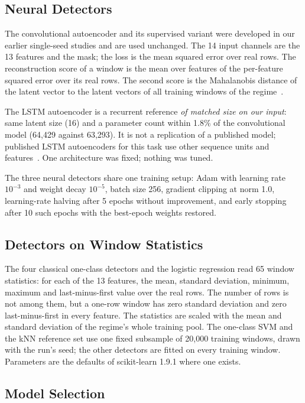 \subsection{Neural Detectors}

The convolutional autoencoder and its supervised variant were developed in our earlier single-seed studies and are
used unchanged. The 14 input channels are the 13 features and the mask; the loss is the mean squared error over
real rows. The reconstruction score of a window is the mean over features of the per-feature squared error over
its real rows. The second score is the Mahalanobis distance of the latent vector to the latent vectors of all
training windows of the regime~\cite{denouden2018improving}.

The LSTM autoencoder is a recurrent reference \emph{of matched size on our input}: same latent size (16) and a
parameter count within 1.8\% of the convolutional model (64{,}429 against 63{,}293). It is not a replication of a
published model; published LSTM autoencoders for this task use other sequence units and
features~\cite{alladi2021deep,vishwanath2026federated}. One architecture was fixed; nothing was tuned.

The three neural detectors share one training setup: Adam with learning rate $10^{-3}$ and weight decay
$10^{-5}$, batch size 256, gradient clipping at norm 1.0, learning-rate halving after 5 epochs without
improvement, and early stopping after 10 such epochs with the best-epoch weights restored.

\subsection{Detectors on Window Statistics}

The four classical one-class detectors and the logistic regression read 65 window statistics: for each of the 13
features, the mean, standard deviation, minimum, maximum and last-minus-first value over the real rows. The
number of rows is not among them, but a one-row window has zero standard deviation and zero last-minus-first in
every feature. The statistics are scaled with the mean and standard deviation of the regime's whole training
pool. The one-class SVM and the kNN reference set use one fixed subsample of 20{,}000 training windows, drawn with
the run's seed; the other detectors are fitted on every training window. Parameters are the defaults of
scikit-learn 1.9.1 where one exists.

\subsection{Model Selection}

